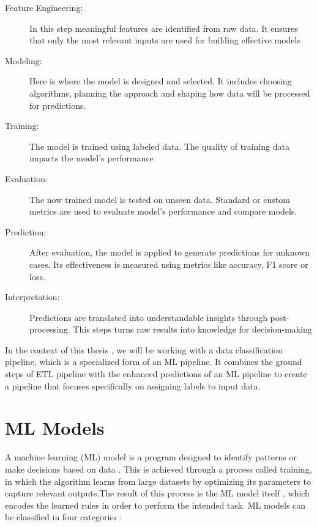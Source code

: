 \begin{description}
  \item[Feature Engineering:] In this step meaningful features are identified from raw data. It ensures that only the most relevant inputs are used for building effective models
  \item[Modeling:] Here is where the model is designed and selected. It includes choosing algorithms, planning the approach and shaping how data will be processed for predictions.
  \item[Training:] The model is trained using labeled data. The quality of training data impacts the model’s performance
  \item[Evaluation:] The now trained model is tested on unseen data. Standard or custom metrics are used to evaluate model’s performance and compare models.
  \item[Prediction:] After evaluation, the model is applied to generate predictions for unknown cases. Its effectiveness is measured using metrics like accuracy, F1 score or loss.
  \item[Interpretation:] Predictions are translated into understandable insights through post-processing. This steps turns raw results into knowledge for decision-making
\end{description}

In the context of this thesis , we will be working with a data classification pipeline, which is a specialized form of an ML pipeline. It combines the ground steps of ETL pipeline with the enhanced predictions of an ML pipeline to create a pipeline that focuses specifically on assigning labels to input data.


\section{ML Models}
\label{sec:background:ml_models}
A machine learning (ML) model is a program designed to identify patterns or make decisions based on data \cite{databricks:2022}. This is achieved through a process called training, in which the algorithm learns from large datasets by optimizing its parameters to capture relevant outputs.The result of this process is the ML model itself , which encodes the learned rules in order to perform the intended task. ML models can be classified in four categories \cite{khoei:2023}:

